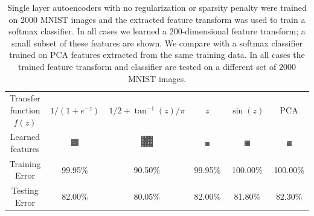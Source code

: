 \documentclass[twocolumn]{article}
\begin{document}
\begin{table}
  \centering
  \begin{tabular}{|C|CCCC|C|}
  \hline
  Transfer function $f(z)$ & $1/(1+e^{-z})$ & $1/2+\tan^{-1}(z)/\pi$ & $z$ & $\sin(z)$ & PCA \\
  Learned features
    & \includegraphics[width=0.15\textwidth]{aeFigs/sigmoid.png}
    & \includegraphics[width=0.15\textwidth]{aeFigs/atan.png}
    & \includegraphics[width=0.15\textwidth]{aeFigs/id.png}
    & \includegraphics[width=0.15\textwidth]{aeFigs/sin.png} 
    & \includegraphics[width=0.15\textwidth]{aeFigs/pca.png} \\
  Training Error & 99.95\% & 90.50\% & 99.95\% & 100.00\% & 100.00\% \\
  Testing Error & 82.00\% & 80.05\% & 82.00\% & 81.80\% & 82.30\% \\
  \hline
  \end{tabular}
  \caption{Single layer autoencoders with no regularization or sparsity penalty were trained on
    2000 MNIST images and the extracted feature transform was used to train a softmax classifier.
    In all cases we learned a 200-dimensional feature transform; a small subset of these features
    are shown. We compare with a softmax classifier trained on PCA features extracted from the same
    training data. In all cases the trained feature transform and classifier are tested on a different
    set of 2000 MNIST images.}
\end{table}
\end{document}
